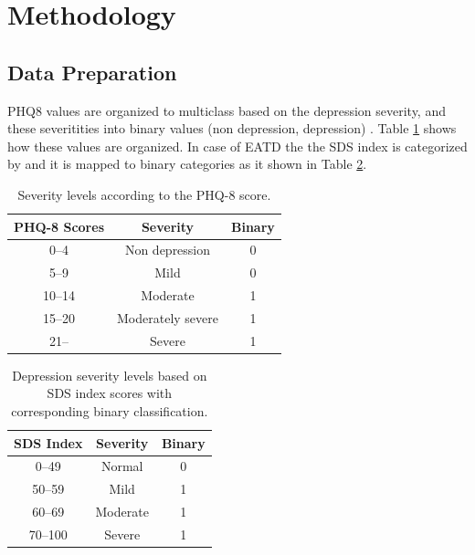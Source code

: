 \section{Methodology}

\subsection{Data Preparation}

PHQ8 values are organized to multiclass \cite{kroenke2001phq} based on the depression severity, and these severitities into binary values (non depression, depression) \cite{kroenke2009phq}. Table \ref{tab:phq8_severity} shows how these values are organized. In case of EATD the the SDS index is categorized by and it is mapped to binary categories as it shown in Table \ref{tab:sds_index_classification}.

\begin{table}[H]
    \centering
    \caption{Severity levels according to the PHQ-8 score.}
    \begin{tabular}{|c|c|c|}
    \hline
    \textbf{PHQ-8 Scores} & \textbf{Severity} & \textbf{Binary} \\
    \hline
    0--4 & Non depression & 0 \\
    5--9 & Mild & 0 \\
    10--14 & Moderate & 1 \\
    15--20 & Moderately severe & 1 \\
    21-- & Severe & 1 \\
    \hline
    \end{tabular}
    
    \label{tab:phq8_severity}
\end{table}

\begin{table}[H]
    \centering
    \caption{Depression severity levels based on SDS index scores with corresponding binary classification.}
    \begin{tabular}{|c|c|c|}
    \hline
    \textbf{SDS Index} & \textbf{Severity} & \textbf{Binary} \\
    \hline
    0--49 & Normal & 0 \\
    50--59 & Mild & 1 \\
    60--69 & Moderate & 1 \\
    70--100 & Severe & 1 \\
    \hline
    \end{tabular}
    
    \label{tab:sds_index_classification}
\end{table}

